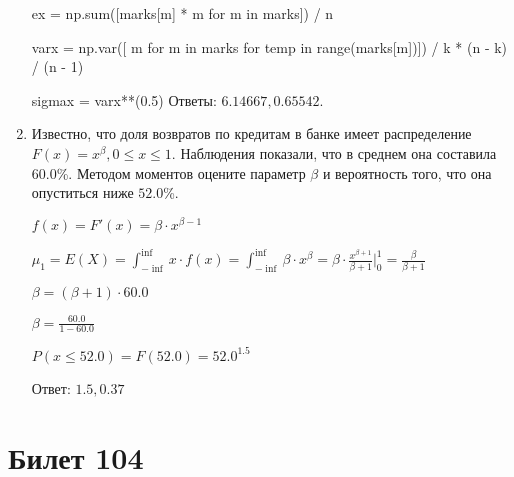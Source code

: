 \documentclass[a4paper,12pt]{article}
\begin{document}
\begin{enumerate}
    ex = np.sum([marks[m] * m for m in marks]) / n

    varx = np.var([ m for m in marks for temp in range(marks[m])]) / k * (n - k) / (n - 1)

    sigmax = varx**(0.5)
    Ответы: $6.14667, 0.65542$.

    

\item

    
	Известно, что доля возвратов по кредитам в банке имеет распределение $F(x) = x^{\beta}, 0 \le x \le 1$. Наблюдения показали, что в среднем она составила $60.0$\%. Методом моментов оцените параметр $\beta$ и вероятность того, что она опуститься ниже $52.0$\%.
	


	

	$f(x) = F'(x) = \beta \cdot x^{\beta - 1}$

	$\mu_{1} = E(X) = \int_{-\inf}^{\inf}x \cdot f(x) = \int_{-\inf}^{\inf} \beta \cdot x^{\beta} = \beta \cdot \frac{x^{\beta + 1}}{\beta + 1}\bigg|_0^1 = \frac{\beta}{\beta + 1}$

	$\beta = (\beta + 1) \cdot 60.0$

	$\beta = \frac{60.0}{1 - 60.0}$

	$ P(x \le 52.0) = F(52.0) = 52.0^{1.5} $

    Ответ: $1.5, 0.37$
	


\end{enumerate}

\section{Билет 104}
\end{document}
